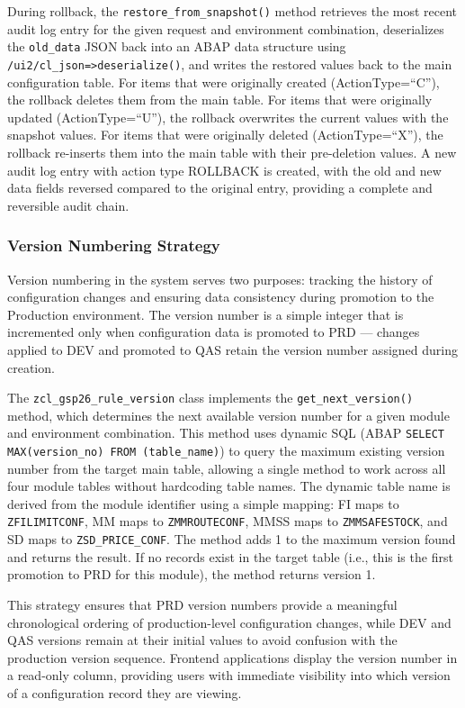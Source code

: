 \documentclass[12pt,a4paper]{report}
\begin{document}
During rollback, the \texttt{restore\_from\_snapshot()} method retrieves the most recent audit log entry for the given request and environment combination, deserializes the \texttt{old\_data} JSON back into an ABAP data structure using \texttt{/ui2/cl\_json=>deserialize()}, and writes the restored values back to the main configuration table. For items that were originally created (ActionType=``C''), the rollback deletes them from the main table. For items that were originally updated (ActionType=``U''), the rollback overwrites the current values with the snapshot values. For items that were originally deleted (ActionType=``X''), the rollback re-inserts them into the main table with their pre-deletion values. A new audit log entry with action type ROLLBACK is created, with the old and new data fields reversed compared to the original entry, providing a complete and reversible audit chain.

\subsubsection{Version Numbering Strategy}

Version numbering in the system serves two purposes: tracking the history of configuration changes and ensuring data consistency during promotion to the Production environment. The version number is a simple integer that is incremented only when configuration data is promoted to PRD --- changes applied to DEV and promoted to QAS retain the version number assigned during creation.

The \texttt{zcl\_gsp26\_rule\_version} class implements the \texttt{get\_next\_version()} method, which determines the next available version number for a given module and environment combination. This method uses dynamic SQL (ABAP \texttt{SELECT MAX(version\_no) FROM (table\_name)}) to query the maximum existing version number from the target main table, allowing a single method to work across all four module tables without hardcoding table names. The dynamic table name is derived from the module identifier using a simple mapping: FI maps to \texttt{ZFILIMITCONF}, MM maps to \texttt{ZMMROUTECONF}, MMSS maps to \texttt{ZMMSAFESTOCK}, and SD maps to \texttt{ZSD\_PRICE\_CONF}. The method adds 1 to the maximum version found and returns the result. If no records exist in the target table (i.e., this is the first promotion to PRD for this module), the method returns version 1.

This strategy ensures that PRD version numbers provide a meaningful chronological ordering of production-level configuration changes, while DEV and QAS versions remain at their initial values to avoid confusion with the production version sequence. Frontend applications display the version number in a read-only column, providing users with immediate visibility into which version of a configuration record they are viewing.
\end{document}
